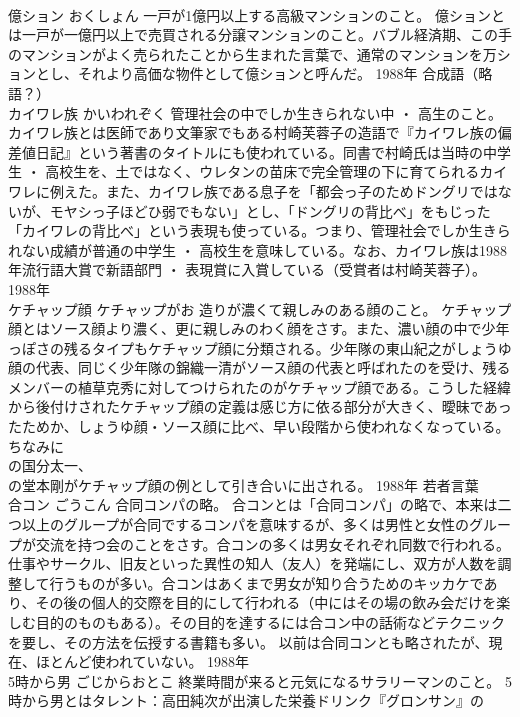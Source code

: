 \documentclass[8pt]{extreport}
\begin{document}
\begin{CJK}{UTF8}{min}
\\	億ション	おくしょん	一戸が1億円以上する高級マンションのこと。	億ションとは一戸が一億円以上で売買される分譲マンションのこと。バブル経済期、この手のマンションがよく売られたことから生まれた言葉で、通常のマンションを万ションとし、それより高価な物件として億ションと呼んだ。	1988年	合成語（略語？）	
\\	カイワレ族	かいわれぞく	管理社会の中でしか生きられない中 ・ 高生のこと。	カイワレ族とは医師であり文筆家でもある村崎芙蓉子の造語で『カイワレ族の偏差値日記』という著書のタイトルにも使われている。同書で村崎氏は当時の中学生 ・ 高校生を、土ではなく、ウレタンの苗床で完全管理の下に育てられるカイワレに例えた。また、カイワレ族である息子を「都会っ子のためドングリではないが、モヤシっ子ほどひ弱でもない」とし、「ドングリの背比べ」をもじった「カイワレの背比べ」という表現も使っている。つまり、管理社会でしか生きられない成績が普通の中学生 ・ 高校生を意味している。なお、カイワレ族は1988年流行語大賞で新語部門 ・ 表現賞に入賞している（受賞者は村崎芙蓉子）。	1988年	
\\	ケチャップ顔	ケチャップがお	造りが濃くて親しみのある顔のこと。	ケチャップ顔とはソース顔より濃く、更に親しみのわく顔をさす。また、濃い顔の中で少年っぽさの残るタイプもケチャップ顔に分類される。少年隊の東山紀之がしょうゆ顔の代表、同じく少年隊の錦織一清がソース顔の代表と呼ばれたのを受け、残るメンバーの植草克秀に対してつけられたのがケチャップ顔である。こうした経緯から後付けされたケチャップ顔の定義は感じ方に依る部分が大きく、曖昧であったためか、しょうゆ顔・ソース顔に比べ、早い段階から使われなくなっている。 ちなみに
\\	の国分太一、
\\	の堂本剛がケチャップ顔の例として引き合いに出される。	1988年	若者言葉	
\\	合コン	ごうこん	合同コンパの略。	合コンとは「合同コンパ」の略で、本来は二つ以上のグループが合同でするコンパを意味するが、多くは男性と女性のグループが交流を持つ会のことをさす。合コンの多くは男女それぞれ同数で行われる。仕事やサークル、旧友といった異性の知人（友人）を発端にし、双方が人数を調整して行うものが多い。合コンはあくまで男女が知り合うためのキッカケであり、その後の個人的交際を目的にして行われる（中にはその場の飲み会だけを楽しむ目的のものもある）。その目的を達するには合コン中の話術などテクニックを要し、その方法を伝授する書籍も多い。 以前は合同コンとも略されたが、現在、ほとんど使われていない。	1988年	
\\	5時から男	ごじからおとこ	終業時間が来ると元気になるサラリーマンのこと。	5時から男とはタレント：高田純次が出演した栄養ドリンク『グロンサン』の

\end{CJK}
\end{document}

